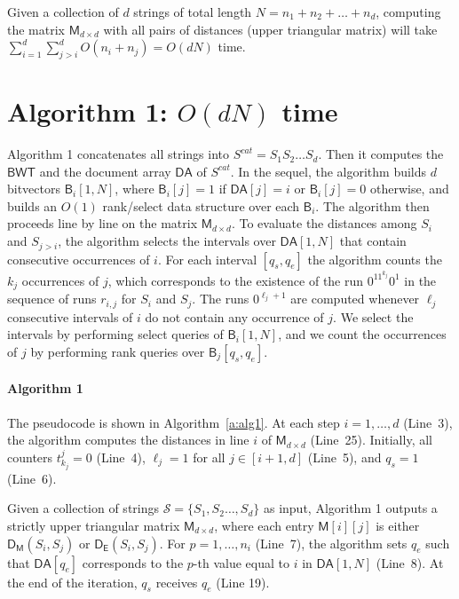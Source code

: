 \documentclass{elsarticle}
\newcommand{\DA}{\ensuremath{\mathsf{DA}}\xspace}
\newcommand{\BWT}{\ensuremath{\mathsf{BWT}}\xspace}
\newcommand{\BM}{\ensuremath{\mathsf{B}}\xspace}
\renewcommand{\S}{\mathcal{S}}
\newcommand{\Dm}[2]{\ensuremath{\mathsf{D_M}(#1, #2)}\xspace}
\newcommand{\De}[2]{\ensuremath{\mathsf{D_E}(#1, #2)}\xspace}
\newcommand{\Md}{\ensuremath{\mathsf{M}}\xspace}
\begin{document}
Given a collection of $d$ strings of total length
$N=n_1+n_2+\dots+n_d$, computing the matrix $\Md_{d\times d}$ with all pairs of distances (upper
triangular matrix) will take $\sum_{i=1}^{d}\sum_{j>i}^{d}O(n_i+n_j) =
O(dN)$ time.


\section{Algorithm 1: $O(dN)$ time}\label{s:alg1}



Algorithm 1 concatenates all strings into $S^{cat}=S_1S_2\ldots S_d$.  Then it
computes the \BWT and the document array \DA of $S^{cat}$.  In the sequel, the
algorithm builds $d$ bitvectors $\BM_i[1,N]$, where $\BM_i[j]=1$ if
$\DA[j] = i$ or $\BM_i[j]=0$ otherwise, and builds an $O(1)$ rank/select data structure
over each $\BM_i$.
The algorithm then proceeds line by line on the matrix $\Md_{d\times d}$.
To evaluate the distances among $S_i$ and $S_{j>i}$, the algorithm selects the
intervals over $\DA[1,N]$ that contain consecutive occurrences of $i$.
For each interval $[q_s, q_e]$ the algorithm counts the $k_j$ occurrences of $j$, which
corresponds to the existence of the run $0^11^{k_j}0^1$ in the sequence of runs $r_{i,j}$ for $S_i$
and $S_j$.
The runs $0^{\ell_j+1}$ are computed whenever $\ell_j$ consecutive intervals of $i$ do
not contain any occurrence of $j$.
We select the intervals by performing select queries of $\BM_i[1, N]$,
and we count the occurrences of $j$ by performing rank queries over $\BM_j[q_s, q_e]$.

\paragraph{Algorithm 1}
The pseudocode is shown in Algorithm~\ref{a:alg1}.
At each step $i=1, \dots, d$ (Line~3), the algorithm computes the distances in line $i$
of $\Md_{d\times d}$ (Line~25).
Initially, all counters $t^{j}_{k_j}=0$ (Line~4),
$\ell_j=1$ for all $j \in [i+1, d]$ (Line~5),
and $q_s=1$ (Line~6).

Given a collection of strings $\S = \{S_1, S_2 \dots, S_d\}$ as input,
Algorithm 1 outputs a strictly upper triangular matrix $\Md_{d\times d}$, where each entry
$\Md[i][j]$ is either \Dm{S_i}{S_j} or \De{S_i}{S_j}.
For $p=1,\dots,n_i$ (Line~7), the algorithm sets $q_{e}$ such that $\DA[q_{e}]$
corresponds to the $p$-th value equal to $i$ in $\DA[1,N]$ (Line~8).
At the end of the iteration, $q_{s}$ receives $q_e$ (Line 19).
\end{document}
